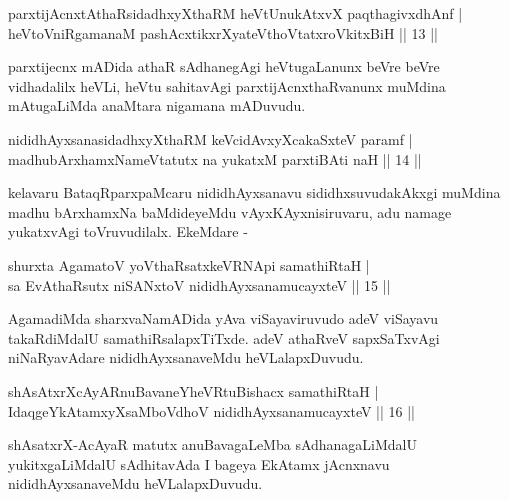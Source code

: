 
\begin{shl}
parxtijAcnxtAthaRsidadhxyXthaRM heVtUnukAtxvX paqthagivxdhAnf |\\
heVtoVniRgamanaM pashAcxtikxrXyateV\s thoVtatxroVkitxBiH \hfill || 13 ||
\end{shl}

\begin{artha}
parxtijecnx mADida athaR sAdhanegAgi heVtugaLanunx beVre beVre vidhadalilx heVLi, heVtu sahitavAgi parxtijAcnxthaRvanunx muMdina mAtugaLiMda anaMtara nigamana mADuvudu.
\end{artha}

\begin{shl}
nididhAyxsanasidadhxyXthaRM keVcidAvxyXcakaSxteV paramf |\\
madhubArxhamxNameVtatutx na yukatxM parxtiBAti naH \hfill || 14 ||
\end{shl}

\begin{artha}
kelavaru BataqRparxpaMcaru nididhAyxsanavu sididhxsuvudakAkxgi muMdina
madhu bArxhamxNa baMdideyeMdu vAyxKAyxnisiruvaru, adu namage
yukatxvAgi toVruvudilalx. EkeMdare -
\end{artha}

\begin{shl}
shurxta AgamatoV yoV\s thaRsatxkeVRNApi samathiRtaH |\\
sa EvAthaRsutx niSANxtoV nididhAyxsanamucayxteV \hfill || 15 ||
\end{shl}

\begin{artha}
AgamadiMda sharxvaNamADida yAva viSayaviruvudo adeV viSayavu takaRdiMdalU samathiRsalapxTiTxde. adeV athaRveV sapxSaTxvAgi niNaRyavAdare nididhAyxsanaveMdu heVLalapxDuvudu.
\end{artha}


\begin{shl}
shAsAtxrXcAyARnuBavaneYheVRtuBishacx samathiRtaH |\\
IdaqgeYkAtamxyXsaMboVdhoV nididhAyxsanamucayxteV \hfill || 16 ||
\end{shl}

\begin{artha}
shAsatxrX-AcAyaR matutx anuBavagaLeMba sAdhanagaLiMdalU yukitxgaLiMdalU sAdhitavAda I bageya EkAtamx jAcnxnavu nididhAyxsanaveMdu heVLalapxDuvudu.
\end{artha}

